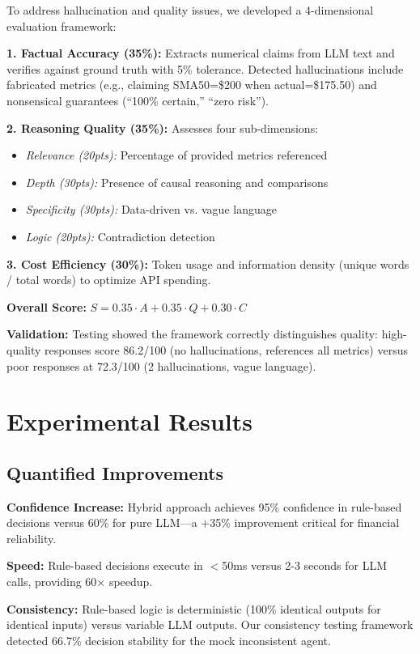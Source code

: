 \documentclass[11pt,letterpaper]{article}
\begin{document}
To address hallucination and quality issues, we developed a 4-dimensional evaluation framework:

\textbf{1. Factual Accuracy (35\%):} Extracts numerical claims from LLM text and verifies against ground truth with 5\% tolerance. Detected hallucinations include fabricated metrics (e.g., claiming SMA50=\$200 when actual=\$175.50) and nonsensical guarantees (``100\% certain,'' ``zero risk'').

\textbf{2. Reasoning Quality (35\%):} Assesses four sub-dimensions:
\begin{itemize}
    \item \textit{Relevance (20pts):} Percentage of provided metrics referenced
    \item \textit{Depth (30pts):} Presence of causal reasoning and comparisons
    \item \textit{Specificity (30pts):} Data-driven vs. vague language
    \item \textit{Logic (20pts):} Contradiction detection
\end{itemize}

\textbf{3. Cost Efficiency (30\%):} Token usage and information density (unique words / total words) to optimize API spending.

\textbf{Overall Score:} $S = 0.35 \cdot A + 0.35 \cdot Q + 0.30 \cdot C$

\textbf{Validation:} Testing showed the framework correctly distinguishes quality: high-quality responses score 86.2/100 (no hallucinations, references all metrics) versus poor responses at 72.3/100 (2 hallucinations, vague language).

\section{Experimental Results}

\subsection{Quantified Improvements}

\textbf{Confidence Increase:} Hybrid approach achieves 95\% confidence in rule-based decisions versus 60\% for pure LLM—a +35\% improvement critical for financial reliability.

\textbf{Speed:} Rule-based decisions execute in $<$50ms versus 2-3 seconds for LLM calls, providing 60× speedup.

\textbf{Consistency:} Rule-based logic is deterministic (100\% identical outputs for identical inputs) versus variable LLM outputs. Our consistency testing framework detected 66.7\% decision stability for the mock inconsistent agent.
\end{document}
